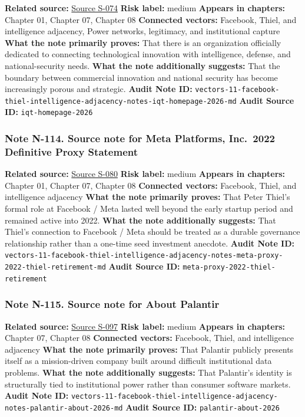\documentclass[
  american,
  11pt,
  letterpaper,
]{article}
\begin{document}
\textbf{Related source:} \hyperref[source-s-074-in-q-tel]{Source S-074}
\textbf{Risk label:} medium \textbf{Appears in chapters:} Chapter 01,
Chapter 07, Chapter 08 \textbf{Connected vectors:} Facebook, Thiel, and
intelligence adjacency, Power networks, legitimacy, and institutional
capture \textbf{What the note primarily proves:} That there is an
organization officially dedicated to connecting technological innovation
with intelligence, defense, and national-security needs. \textbf{What
the note additionally suggests:} That the boundary between commercial
innovation and national security has become increasingly porous and
strategic. \textbf{Audit Note ID:}
\texttt{vectors-11-facebook-thiel-intelligence-adjacency-notes-iqt-homepage-2026-md}
\textbf{Audit Source ID:} \texttt{iqt-homepage-2026}

\subsubsection{Note N-114. Source note for Meta Platforms, Inc.~2022
Definitive Proxy
Statement}\label{note-n-114-vectors-11-facebook-thiel-intelligence-adjacency-notes-meta-proxy-2022-thiel-retirement-md}

\textbf{Related source:}
\hyperref[source-s-080-meta-platforms-inc-2022-definitive-proxy-statement]{Source
S-080} \textbf{Risk label:} medium \textbf{Appears in chapters:} Chapter
01, Chapter 07, Chapter 08 \textbf{Connected vectors:} Facebook, Thiel,
and intelligence adjacency \textbf{What the note primarily proves:} That
Peter Thiel's formal role at Facebook / Meta lasted well beyond the
early startup period and remained active into 2022. \textbf{What the
note additionally suggests:} That Thiel's connection to Facebook / Meta
should be treated as a durable governance relationship rather than a
one-time seed investment anecdote. \textbf{Audit Note ID:}
\texttt{vectors-11-facebook-thiel-intelligence-adjacency-notes-meta-proxy-2022-thiel-retirement-md}
\textbf{Audit Source ID:} \texttt{meta-proxy-2022-thiel-retirement}

\subsubsection{Note N-115. Source note for About
Palantir}\label{note-n-115-vectors-11-facebook-thiel-intelligence-adjacency-notes-palantir-about-2026-md}

\textbf{Related source:} \hyperref[source-s-097-about-palantir]{Source
S-097} \textbf{Risk label:} medium \textbf{Appears in chapters:} Chapter
07, Chapter 08 \textbf{Connected vectors:} Facebook, Thiel, and
intelligence adjacency \textbf{What the note primarily proves:} That
Palantir publicly presents itself as a mission-driven company built
around difficult institutional data problems. \textbf{What the note
additionally suggests:} That Palantir's identity is structurally tied to
institutional power rather than consumer software markets. \textbf{Audit
Note ID:}
\texttt{vectors-11-facebook-thiel-intelligence-adjacency-notes-palantir-about-2026-md}
\textbf{Audit Source ID:} \texttt{palantir-about-2026}
\end{document}
